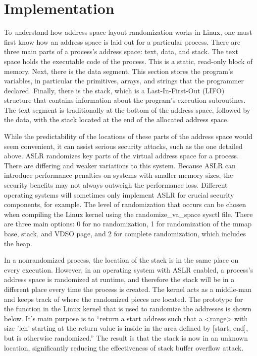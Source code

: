 \section{Implementation}
\label{s:implementation} %

To understand how address space layout randomization works in Linux, one must first know how an address space is laid out for a particular process. There are three main parts of a process’s address space: text, data, and stack. The text space holds the executable code of the process. This is a static, read-only block of memory. Next, there is the data segment. This section stores the program’s variables, in particular the primitives, arrays, and strings that the programmer declared. Finally, there is the stack, which is a Last-In-First-Out (LIFO) structure that contains information about the program’s execution subroutines. The text segment is traditionally at the bottom of the address space, followed by the data, with the stack located at the end of the allocated address space.

While the predictability of the locations of these parts of the address space would seem convenient, it can assist serious security attacks, such as the one detailed above. ASLR randomizes key parts of the virtual address space for a process. There are differing and weaker variations to this system. Because ASLR can introduce performance penalties on systems with smaller memory sizes, the security benefits may not always outweigh the performance loss. Different operating systems will sometimes only implement ASLR for crucial security components, for example. The level of randomization that occurs can be chosen when compiling the Linux kernel using the randomize_va_space sysctl file. There are three main options: 0 for no randomization, 1 for randomization of the mmap base, stack, and VDSO page, and 2 for complete randomization, which includes the heap. \cite{kerneldocs}

In a nonrandomized process, the location of the stack is in the same place on every execution. However, in an operating system with ASLR enabled, a process’s address space is randomized at runtime, and therefore the stack will be in a different place every time the process is created. The kernel acts as a middle-man and keeps track of where the randomized pieces are located. The prototype for the function in the Linux kernel that is used to randomize the addresses is shown below. It’s main purpose is to “return a start address such that a <range> with size 'len' starting at the return value is inside in the area defined by [start, end], but is otherwise randomized.” \cite{randomc} The result is that the stack is now in an unknown location, significantly reducing the effectiveness of stack buffer overflow attack.
